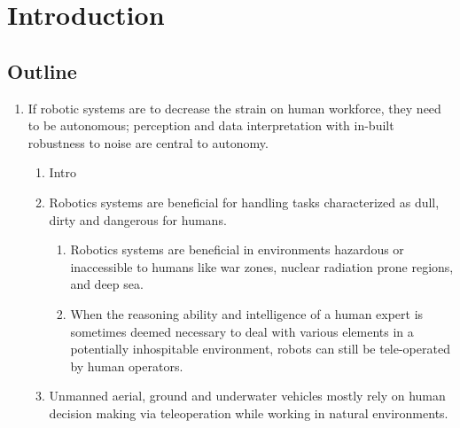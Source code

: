 \documentclass {udthesis}
\begin{document}

\chapter{Introduction}
\label{chap:thesis_intro}

\section{Outline}

\begin{enumerate}[label=Chapter \arabic*:]
  \item If robotic systems are to decrease the strain on human workforce, they need to be autonomous; 
  perception and data interpretation with in-built robustness to noise are central to autonomy. 

  \begin{enumerate}[label=Section \arabic*:, start=0]
  \item Intro

  \item Robotics systems are beneficial for handling tasks characterized as dull, dirty and dangerous for humans.
  
    \begin{enumerate}[label=Para \arabic*:, start=1]
       
      \item Robotics systems are beneficial in environments hazardous or inaccessible to humans like war zones, nuclear radiation prone regions, and deep sea.
      
      \item When the reasoning ability and intelligence of a human expert is sometimes deemed necessary to deal with various elements in a potentially inhospitable environment, robots can still be tele-operated by human operators.
      
    \end{enumerate}

  \item Unmanned aerial, ground and underwater vehicles mostly rely on human decision making via teleoperation while working in natural environments.
  
    \begin{enumerate}[label=Para \arabic*:, start=1]
    

\end{enumerate}
\end{enumerate}
\end{enumerate}
\end{document}
